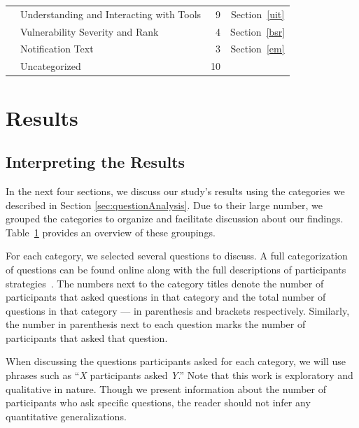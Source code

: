 \documentclass[10pt,journal,compsoc]{IEEEtran}
\begin{document}
\begin{table}
\begin{tabularx}{\textwidth}{|l|X|r|c|}
		
		
		& Understanding and Interacting with Tools						& 9     		& Section~\ref{uit}			\\
		
		& Vulnerability Severity and Rank								& 4     		& Section~\ref{bsr}		\\
		
		& Notification Text												& 3     		& Section~\ref{em}		\\
		
		\hline	
		& Uncategorized													& 10    		&			 \\
		\hline
	\end{tabularx}
	\label{table:categories}
\end{table}



\section{Results}
\label{sec:results}
\subsection{Interpreting the Results}

In the next four sections, we discuss our study's results using the categories we described in Section \ref{sec:questionAnalysis}.
Due to their large number, we grouped the categories to organize and facilitate discussion about our findings. 
Table~\ref{table:categories} provides an overview of these groupings.

For each category, we selected several questions to discuss. A full categorization of questions can be found online along with the full descriptions of participants strategies~\cite{ExperimentalMaterials}.
The numbers next to the category titles denote the number of participants that asked questions in that category and the total number of questions in that category --- in parenthesis and brackets respectively. Similarly, the number in parenthesis next to each question marks the number of participants that asked that question.

When discussing the questions participants asked for each category, we will use phrases such as ``\emph{X} participants asked \emph{Y}.''
Note that this work is exploratory and qualitative in nature.
Though we present information about the number of participants who ask specific questions, the reader should not infer any quantitative generalizations.
\end{document}
